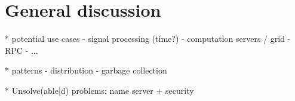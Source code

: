 
\section{General discussion}

* potential use cases
  - signal processing (time?)
  - computation servers / grid
  - RPC
  - ...

* patterns
  - distribution
  - garbage collection

* Unsolve(able|d) problems: name server + security
